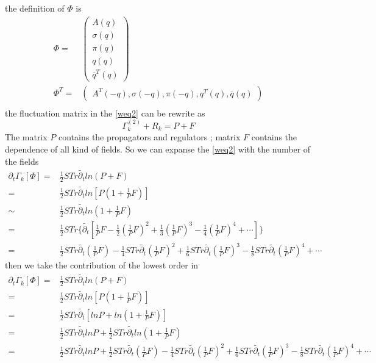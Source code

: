 \documentclass[UTF8]{article}
\begin{document}
the definition of $\Phi$ is
\begin{equation}
\begin{split}
\Phi=&
\begin{pmatrix}
 A(q)\\\sigma(q)\\\pi(q)\\q(q)\\\overline{q}^T(q)
\end{pmatrix}\\
\Phi^T=&
\begin{pmatrix}
A^T(-q),\sigma(-q),\pi(-q),q^T(q),\overline{q}(q)
\end{pmatrix}\\
\end{split}
\end{equation}
the fluctuation matrix in the \eqref{weq2} can be rewrite as
\begin{equation}
\Gamma^{(2)}_{k}+R_k=P+F
\end{equation}
The matrix $P$ contains the propagators and regulators ; matrix $F$ contains the dependence of 
all kind of fields. So we can expanse the \eqref{weq2} with the number of the fields
\begin{equation}
\begin{split}
\partial_t\Gamma_k[\Phi]=&\frac{1}{2}STr\widetilde{\partial_t}ln(P+F)\\
=&\frac{1}{2}STr\widetilde{\partial_t}ln[P(1+\frac{1}{P}F)]\\
\sim&\frac{1}{2}STr\widetilde{\partial_t}ln(1+\frac{1}{P}F)\\
=&\frac{1}{2}STr\{\widetilde{\partial_t}[\frac{1}{P}F-\frac{1}{2}(\frac{1}{P}F)^2+\frac{1}{3}
(\frac{1}{P}F)^3-\frac{1}{4}(\frac{1}{P}F)^4+\cdots]\}\\
=&\frac{1}{2}STr\widetilde{\partial_t}(\frac{1}{P}F)-\frac{1}{4}STr\widetilde{\partial_t}
(\frac{1}{P}F)^2+\frac{1}{6}STr\widetilde{\partial_t}(\frac{1}{P}F)^3-\frac{1}{8}STr\widetilde
{\partial_t}(\frac{1}{P}F)^4+\cdots
\end{split}
\end{equation}
then we take the contribution of the lowest order in
\begin{equation}
\begin{split}
\partial_t\Gamma_k[\Phi]=&\frac{1}{2}STr\widetilde{\partial_t}ln(P+F)\\
=&\frac{1}{2}STr\widetilde{\partial_t}ln[P(1+\frac{1}{P}F)]\\
=&\frac{1}{2}STr\widetilde{\partial_t}[lnP+ln(1+\frac{1}{P}F)]\\
=&\frac{1}{2}STr\widetilde{\partial_t}lnP+\frac{1}{2}STr\widetilde{\partial_t}ln(1+\frac{1}{P}F)\\
=&\frac{1}{2}STr\widetilde{\partial_t}lnP+\frac{1}{2}STr\widetilde{\partial_t}(\frac{1}{P}F)
-\frac{1}{4}STr\widetilde{\partial_t}(\frac{1}{P}F)^2
+\frac{1}{6}STr\widetilde{\partial_t}(\frac{1}{P}F)^3
-\frac{1}{8}STr\widetilde{\partial_t}(\frac{1}{P}F)^4+\cdots
\end{split}
\end{equation}
\end{document}
